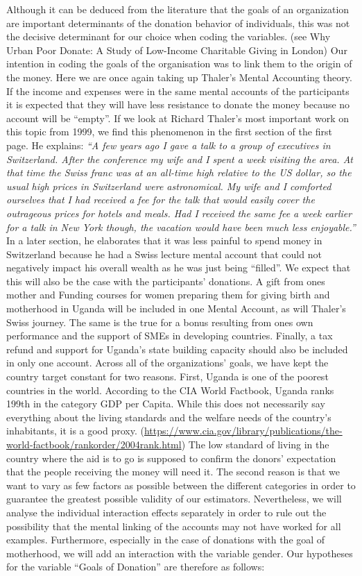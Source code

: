 \documentclass[
  12pt,
]{article}
\begin{document}
Although it can be deduced from the literature that the goals of an
organization are important determinants of the donation behavior of
individuals, this was not the decisive determinant for our choice when
coding the variables. (see Why Urban Poor Donate: A Study of Low-Income
Charitable Giving in London) Our intention in coding the goals of the
organisation was to link them to the origin of the money. Here we are
once again taking up Thaler's Mental Accounting theory. If the income
and expenses were in the same mental accounts of the participants it is
expected that they will have less resistance to donate the money because
no account will be ``empty''. If we look at Richard Thaler's most
important work on this topic from 1999, we find this phenomenon in the
first section of the first page. He explains: \emph{``A few years ago I
gave a talk to a group of executives in Switzerland. After the
conference my wife and I spent a week visiting the area. At that time
the Swiss franc was at an all-time high relative to the US dollar, so
the usual high prices in Switzerland were astronomical. My wife and I
comforted ourselves that I had received a fee for the talk that would
easily cover the outrageous prices for hotels and meals. Had I received
the same fee a week earlier for a talk in New York though, the vacation
would have been much less enjoyable.''} In a later section, he
elaborates that it was less painful to spend money in Switzerland
because he had a Swiss lecture mental account that could not negatively
impact his overall wealth as he was just being ``filled''. We expect
that this will also be the case with the participants' donations. A gift
from ones mother and Funding courses for women preparing them for giving
birth and motherhood in Uganda will be included in one Mental Account,
as will Thaler's Swiss journey. The same is the true for a bonus
resulting from ones own performance and the support of SMEs in
developing countries. Finally, a tax refund and support for Uganda's
state building capacity should also be included in only one account.
Across all of the organizations' goals, we have kept the country target
constant for two reasons. First, Uganda is one of the poorest countries
in the world. According to the CIA World Factbook, Uganda ranks 199th in
the category GDP per Capita. While this does not necessarily say
everything about the living standards and the welfare needs of the
country's inhabitants, it is a good proxy.
(\url{https://www.cia.gov/library/publications/the-world-factbook/rankorder/2004rank.html})
The low standard of living in the country where the aid is to go is
supposed to confirm the donors' expectation that the people receiving
the money will need it. The second reason is that we want to vary as few
factors as possible between the different categories in order to
guarantee the greatest possible validity of our estimators.
Nevertheless, we will analyse the individual interaction effects
separately in order to rule out the possibility that the mental linking
of the accounts may not have worked for all examples. Furthermore,
especially in the case of donations with the goal of motherhood, we will
add an interaction with the variable gender. Our hypotheses for the
variable ``Goals of Donation'' are therefore as follows:
\end{document}
